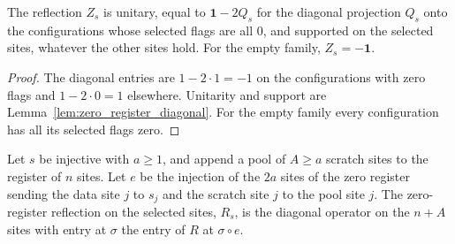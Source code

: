\begin{lemma}
    \label{lem:zero_register_selected}
    \leanok
    The reflection $Z_s$ is unitary, equal to $\mathbf 1-2Q_s$ for the diagonal projection
    $Q_s$ onto the configurations whose selected flags are all $0$, and supported on the
    selected sites, whatever the other sites hold. For the empty family, $Z_s=-\mathbf 1$.
\end{lemma}
\begin{proof}\leanok
    The diagonal entries are $1-2\cdot1=-1$ on the configurations with zero flags and
    $1-2\cdot0=1$ elsewhere. Unitarity and support are
    Lemma~\ref{lem:zero_register_diagonal}. For the empty family every configuration has all
    its selected flags zero.
\end{proof}

\begin{definition}
    \label{def:zero_register_selected_reflection}
    \leanok
    Let $s$ be injective with $a\geq1$, and append a pool of $A\geq a$ scratch sites to the
    register of $n$ sites. Let $e$ be the injection of the $2a$ sites of the zero register
    sending the data site $j$ to $s_j$ and the scratch site $j$ to the pool site $j$. The
    zero-register reflection on the selected sites, $R_s$, is the diagonal operator on the
    $n+A$ sites with entry at $\sigma$ the entry of $R$ at $\sigma\circ e$.
\end{definition}

